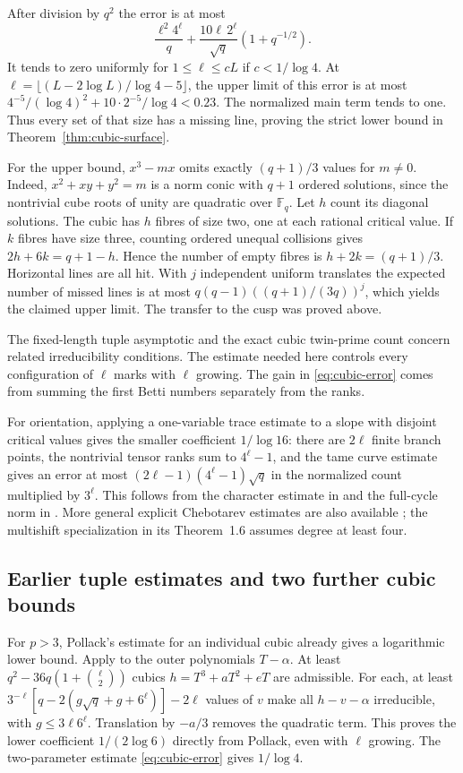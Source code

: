 \documentclass[preprint,12pt,numbers]{elsarticle}
\begin{document}
After division by $q^2$ the error is at most
\[
       \frac{\ell^2 4^\ell}{q}+
       \frac{10\ell\,2^\ell}{\sqrt q}(1+q^{-1/2}).
\]
It tends to zero uniformly for $1\le\ell\le cL$ if $c<1/\log4$.
At $\ell=\lfloor(L-2\log L)/\log4-5\rfloor$, the upper limit of
this error is at most $4^{-5}/(\log4)^2+10\cdot2^{-5}/\log4<0.23$.
The normalized main term tends to one. Thus every set of that size has
a missing line, proving the strict lower bound in
Theorem~\ref{thm:cubic-surface}.

For the upper bound, $x^3-mx$ omits exactly $(q+1)/3$ values for
$m\ne0$. Indeed, $x^2+xy+y^2=m$ is a norm conic with $q+1$ ordered
solutions, since the nontrivial cube roots of unity are quadratic over
$\mathbb F_q$. Let $h$ count its diagonal solutions. The cubic has $h$
fibres of size two, one at each rational critical value. If $k$ fibres
have size three, counting ordered unequal collisions gives
$2h+6k=q+1-h$. Hence the number of empty fibres is $h+2k=(q+1)/3$.
Horizontal lines are all hit. With $j$ independent uniform translates
the expected number of missed lines is at most
$q(q-1)((q+1)/(3q))^j$, which yields the claimed upper limit.
The transfer to the cusp was proved above.

The fixed-length tuple asymptotic \cite{BaryTuple} and the exact cubic
twin-prime count \cite{BaryStix} concern related irreducibility
conditions. The estimate needed here controls every configuration of
$\ell$ marks with $\ell$ growing. The gain in \eqref{eq:cubic-error}
comes from summing the first Betti numbers separately from the ranks.

For orientation, applying a one-variable trace estimate to a slope with
disjoint critical values gives the smaller coefficient $1/\log16$:
there are $2\ell$ finite branch points, the nontrivial tensor ranks
sum to $4^\ell-1$, and the tame curve estimate gives an error at most
$(2\ell-1)(4^\ell-1)\sqrt q$ in the normalized count multiplied by
$3^\ell$. This follows from the character estimate in
\cite[Prop.~5.1]{Zywina} and the full-cycle norm in
\cite[Props.~6,10]{Bellaiche}. More general explicit Chebotarev
estimates are also available \cite{Shpilka}; the multishift
specialization in its Theorem~1.6 assumes degree at least four.

\subsection{Earlier tuple estimates and two further cubic bounds}

For $p>3$, Pollack's estimate for an individual cubic already gives a
logarithmic lower bound. Apply \cite[Lem.~6, Cor.~15 and the estimate
preceding (4.4)]{Pollack} to the outer polynomials $T-\alpha$. At least
$q^2-36q(1+\binom{\ell}{2})$ cubics $h=T^3+aT^2+eT$ are admissible.
For each, at least
$3^{-\ell}[q-2(g\sqrt q+g+6^\ell)]-2\ell$ values of $v$ make all
$h-v-\alpha$ irreducible, with $g\le3\ell6^\ell$. Translation by
$-a/3$ removes the quadratic term. This proves the lower coefficient
$1/(2\log6)$ directly from Pollack, even with $\ell$ growing.
The two-parameter estimate \eqref{eq:cubic-error} gives $1/\log4$.
\end{document}
